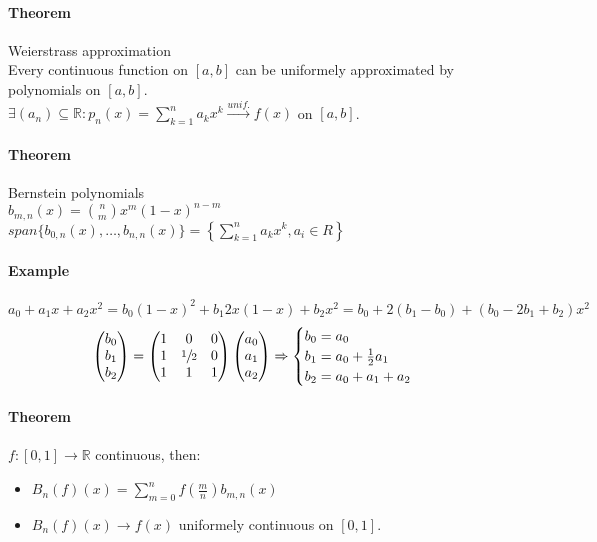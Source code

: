 \documentclass{article}
\newcommand{\DS}{\displaystyle}
\newcommand{\func}[3]{#1 : #2 \rightarrow #3}
\newcommand{\tounif}{\xrightarrow{unif.}}
\newcommand{\sumn}[1]{\sum_{k=1}^n #1}
\newcommand{\intcc}[1]{\left[#1\right]}
\newcommand{\R}{\mathbb{R}}
\newcommand{\vecThree}[3]{\begin{pmatrix}#1 \\ #2 \\ #3\end{pmatrix}}
\newcommand{\Theorem}{\paragraph{Theorem}}
\newcommand{\Example}{\paragraph{Example}}
\begin{document}
  \Theorem Weierstrass approximation
\\Every continuous function on $\intcc{a,b}$ can be uniformely approximated by
  polynomials on $\intcc{a,b}$.
\\$\DS \exists (a_n) \subseteq \R : p_n(x) = \sumn a_k x^k \tounif f(x)$ on
  $\intcc{a,b}$.

  \Theorem Bernstein polynomials
\\$b_{m,n}(x) = \binom{n}{m} x^m (1-x)^{n-m}$
\\$\DS span \{ b_{0,n}(x), \hdots, b_{n,n}(x) \} = \left\{ \sumn a_k x^k, a_i
  \in R \right\}$

  \Example
  \begin{equation*}
    a_0 + a_1x + a_2 x^2 = b_0 (1 - x)^2 + b_1 2x (1-x) + b_2 x^2 =
    b_0 + 2 (b_1 - b_0) + (b_0 - 2b_1 + b_2) x^2
  \end{equation*}
  \begin{equation*}
    \vecThree{b_0}{b_1}{b_2} = \begin{pmatrix}
      1 & 0 & 0 \\
      1 & \sfrac{1}{2} & 0 \\
      1 & 1 & 1
    \end{pmatrix} \vecThree{a_0}{a_1}{a_2} \Rightarrow
    \begin{cases}
      b_0 = a_0 \\
      b_1 = a_0 + \frac{1}{2} a_1 \\
      b_2 = a_0 + a_1 + a_2
    \end{cases}
  \end{equation*}

  \Theorem $\func{f}{\intcc{0,1}}{\R}$ continuous, then:
  \begin{itemize}
    \item $\DS B_n(f)(x) = \sum_{m=0}^{n} f(\frac{m}{n}) b_{m,n}(x)$
    \item $B_n(f)(x) \to f(x)$ uniformely continuous on $\intcc{0,1}$.
  \end{itemize}
\end{document}
